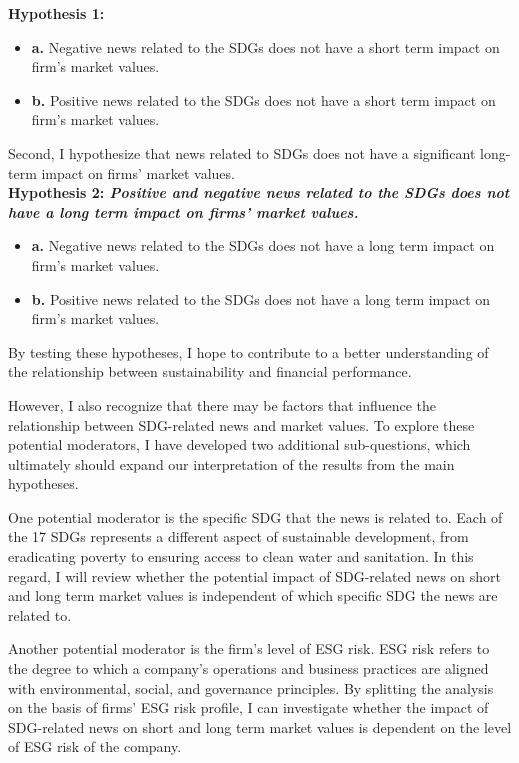 \textbf{Hypothesis 1:} 

\begin{itemize}
  \item \textbf{a.}  Negative news related to the SDGs does not have a short term impact on firm's market values.
  \item \textbf{b.}  Positive news related to the SDGs does not have a short term impact on firm's market values.
\end{itemize}

Second, I hypothesize that news related to SDGs does not have a significant long-term impact on firms' market values. \\

\textbf{
Hypothesis 2: \textit{Positive and negative news related to the SDGs does not have a long term impact on firms' market values.}}

\begin{itemize}
  \item \textbf{a.}  Negative news related to the SDGs does not have a long term impact on firm's market values.
  \item \textbf{b.}  Positive news related to the SDGs does not have a long term impact on firm's market values.
\end{itemize}


By testing these hypotheses, I hope to contribute to a better understanding of the relationship between sustainability and financial performance. 

However, I also recognize that there may be factors that influence the relationship between SDG-related news and market values. 
To explore these potential moderators, I have developed two additional sub-questions, which ultimately should expand our interpretation of the results from the main hypotheses. 

One potential moderator is the specific SDG that the news is related to. Each of the 17 SDGs represents a different aspect of sustainable development, from eradicating poverty to ensuring access to clean water and sanitation. In this regard, I will review whether the potential impact of SDG-related news on short and long term market values is independent of which specific SDG the news are related to.

Another potential moderator is the firm's level of ESG risk. ESG risk refers to the degree to which a company's operations and business practices are aligned with environmental, social, and governance principles.
By splitting the analysis on the basis of firms' ESG risk profile, I can investigate whether the impact of SDG-related news on short and long term market values is dependent on the level of ESG risk of the company. 

